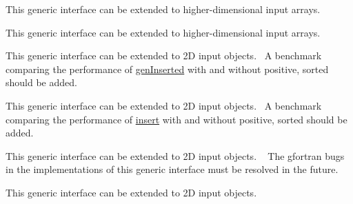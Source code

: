 
\begin{DoxyRefList}
\item[Type \mbox{\hyperlink{interfaceArrayFind__mod_1_1findLoc}{Array\+Find\+\_\+mod\+::find\+Loc}} ]\label{todo__todo000002}%
%
 This generic interface can be extended to higher-\/dimensional input arrays. ~\newline
 
\item[Type \mbox{\hyperlink{interfaceArrayFind__mod_1_1genLoc}{Array\+Find\+\_\+mod\+::gen\+Loc}} ]\label{todo__todo000001}%
%
 This generic interface can be extended to higher-\/dimensional input arrays. ~\newline
 
\item[Type \mbox{\hyperlink{interfaceArrayInsert__mod_1_1genInserted}{Array\+Insert\+\_\+mod\+::gen\+Inserted}} ]\label{todo__todo000003}%
%
 This generic interface can be extended to 2D input objects.~\newline
 A benchmark comparing the performance of \mbox{\hyperlink{interfaceArrayInsert__mod_1_1genInserted}{gen\+Inserted}} with and without {\ttfamily positive, sorted} should be added.~\newline
 
\item[Type \mbox{\hyperlink{interfaceArrayInsert__mod_1_1insert}{Array\+Insert\+\_\+mod\+::insert}} ]\label{todo__todo000004}%
%
 This generic interface can be extended to 2D input objects.~\newline
 A benchmark comparing the performance of \mbox{\hyperlink{interfaceArrayInsert__mod_1_1insert}{insert}} with and without {\ttfamily positive, sorted} should be added.~\newline
 
\item[Type \mbox{\hyperlink{interfaceArrayRemap__mod_1_1remap}{Array\+Remap\+\_\+mod\+::remap}} ]\label{todo__todo000005}%
%
 This generic interface can be extended to 2D input objects. ~\newline
 The gfortran bugs in the implementations of this generic interface must be resolved in the future. ~\newline
 
\item[Type \mbox{\hyperlink{interfaceArrayRemove__mod_1_1genRemoved}{Array\+Remove\+\_\+mod\+::gen\+Removed}} ]\label{todo__todo000006}%
%
 This generic interface can be extended to 2D input objects. ~\newline
 

\end{DoxyRefList}
